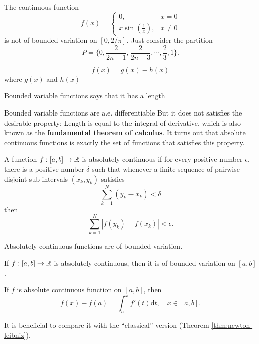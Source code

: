 \begin{example}
    The continuous function 
    $$f(x)=\left\{\begin{matrix}
        0,  &  x=0\\
        x\sin(\frac{1}{x}),  & x\neq 0
        \end{matrix}\right.$$
    is not of bounded variation on $[0,2/\pi]$. Just consider the partition $$P=\{0,\frac{2}{2n-1},\frac{2}{2n-3},\cdots,\frac{2}{3},1\}.$$
\end{example}

\begin{theorem}
    \begin{equation*}
        f(x)=g(x)-h(x)
    \end{equation*}
    where $g(x)$ and $h(x)$ 
\end{theorem}
Bounded variable functions says that it has a length


Bounded variable functions are a.e. differentiable
But it does not satisfies the desirable property: Length is equal to the integral of derivative,
which is also known as the \textbf{fundamental theorem of calculus}.
It turns out that absolute continuous functions is exactly the set of functions that satisfies this property.


\begin{example}
    
\end{example}



\begin{definition}
    A function $f:[a,b]\to \mathbb{R}$ is absolutely continuous if for every positive number $\epsilon$,  there is a positive number $\delta$ such that 
    whenever a finite sequence of pairwise disjoint sub-intervals $(x_k,y_k)$ satisfies
    $$ \sum_{k=1}^{N}(y_k-x_k)<\delta $$
    then $$\sum_{k=1}^{N}|f(y_k)-f(x_k)|<\epsilon.$$
\end{definition}


Absolutely continuous functions are of bounded variation.
\begin{proposition}
    If $f:[a,b]\to\mathbb{R}$ is absolutely continuous, then it is of bounded variation on $[a,b]$.
\end{proposition}

\begin{theorem}\label{thm:abs-cont}
    If $f$ is absolute continuous function on $[a,b]$, then 
    \begin{equation*}
        f(x)-f(a)=\int_{a}^{x}f'(t)\mathrm{d}t,\quad x\in [a,b].
    \end{equation*}
\end{theorem}

It is beneficial to compare it with the ``classical'' version (Theorem \ref{thm:newton-leibniz}).




